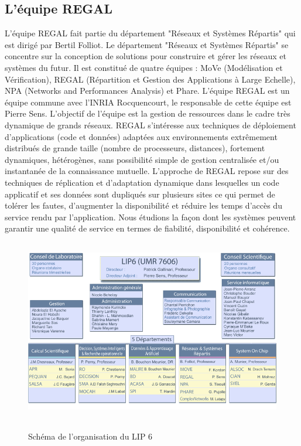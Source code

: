 	\subsection{L'équipe REGAL}
	L'équipe REGAL fait partie du département "Réseaux et Systèmes Répartis" qui est dirigé par Bertil Folliot. Le département "Réseaux et Systèmes Répartis" se concentre sur la conception de solutions pour construire et gérer les réseaux et systèmes du futur. Il est constitué de quatre équipes : MoVe (Modélisation et Vérification), REGAL (Répartition et Gestion des Applications à Large Echelle), NPA (Networks and Performances Analysis) et Phare. L'équipe REGAL est un équipe commune avec l'INRIA Rocquencourt, le responsable de cette équipe est Pierre Sens. L'objectif de l'équipe est la gestion de ressources dans le cadre très dynamique de grands réseaux. REGAL s'intéresse aux techniques de déploiement d'applications (code et données) adaptées aux environnements extrêmement distribués de grande taille (nombre de processeurs, distances), fortement dynamiques, hétérogènes, sans possibilité simple de gestion centralisée et/ou instantanée de la connaissance mutuelle. L'approche de REGAL repose sur des techniques de réplication et d'adaptation dynamique dans lesquelles un code applicatif et ses données sont dupliqués sur plusieurs sites ce qui permet de tolérer les fautes, d'augmenter la disponibilité et réduire les temps d'accès du service rendu par l'application. Nous étudions la façon dont les systèmes peuvent garantir une qualité de service en termes de fiabilité, disponibilité et cohérence.

	\vspace{1.5cm}
        \begin{figure}[!h]
        \centering
        \includegraphics[width=15cm,height=8cm]{../Images/Lip6_Organisation.png}\\
        \caption{Schéma de l'organisation du LIP 6}
        \label{LIP 6}
        \end{figure}
	\vspace{1.5cm}

